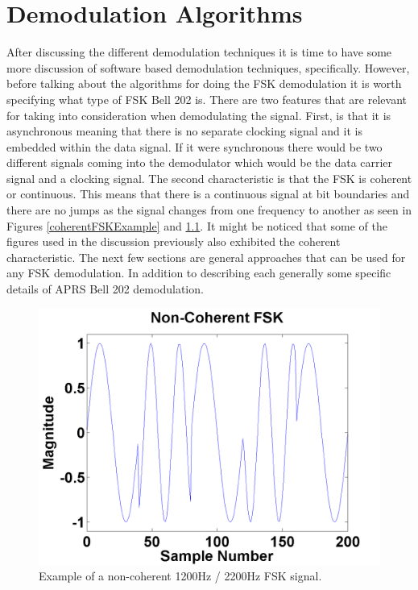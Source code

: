 \chapter{Demodulation Algorithms}
After discussing the different demodulation techniques it is time to have some more discussion of software based demodulation techniques, specifically. However, before talking about the algorithms for doing the FSK demodulation it is worth specifying what type of FSK Bell 202 is. There are two features that are relevant for taking into consideration when demodulating the signal. First, is that it is asynchronous meaning that there is no separate clocking signal and it is embedded within the data signal. If it were synchronous there would be two different signals coming into the demodulator which would be the data carrier signal and a clocking signal. The second characteristic is that the FSK is coherent or continuous. This means that there is a continuous signal at bit boundaries and there are no jumps as the signal changes from one frequency to another as seen in Figures \ref{coherentFSKExample} and \ref{noncoherentFSKExample}. It might be noticed that some of the figures used in the discussion previously also exhibited the coherent characteristic. The next few sections are general approaches that can be used for any FSK demodulation. In addition to describing each generally some specific details of APRS Bell 202 demodulation. 
\begin{figure}
  \centering
	\includegraphics[width=0.75\linewidth]{images/NonCoherentFSK.png} 
	\caption{Example of a non-coherent 1200Hz / 2200Hz FSK signal.}
   \label{noncoherentFSKExample}
\end{figure}
